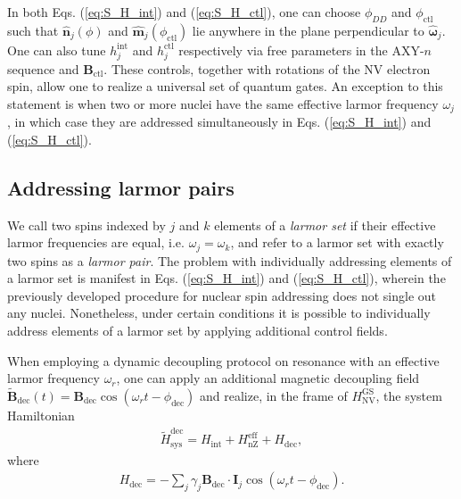\documentclass[twocolumn]{revtex4-1}
\renewcommand{\t}{\text} %
\newcommand{\p}[1]{\left(#1\right)} %
\renewcommand{\v}{\bm} %
\newcommand{\uv}[1]{\hat{\v{#1}}} %
\renewcommand{\c}{\cdot} %
\newcommand{\NV}{\t{NV}}
\begin{document}
In both Eqs. (\ref{eq:S_H_int}) and (\ref{eq:S_H_ctl}), one can choose
$\phi_{DD}$ and $\phi_{\t{ctl}}$ such that $\uv n_j\p\phi$ and
$\uv m_j\p{\phi_{\t{ctl}}}$ lie anywhere in the plane perpendicular to
$\uv\omega_j$. One can also tune $h_j^{\t{int}}$ and $h_j^{\t{ctl}}$
respectively via free parameters in the AXY-$n$ sequence and
$\v B_{\t{ctl}}$. These controls, together with rotations of the NV
electron spin, allow one to realize a universal set of quantum
gates. An exception to this statement is when two or more nuclei have
the same effective larmor frequency $\omega_j$, in which case they are
addressed simultaneously in Eqs. (\ref{eq:S_H_int}) and
(\ref{eq:S_H_ctl}).

\subsection{Addressing larmor pairs}
\label{sec:addressing_pairs}

We call two spins indexed by $j$ and $k$ elements of a \emph{larmor
  set} if their effective larmor frequencies are equal,
i.e. $\omega_j=\omega_k$, and refer to a larmor set with exactly two
spins as a \emph{larmor pair}. The problem with individually
addressing elements of a larmor set is manifest in
Eqs. (\ref{eq:S_H_int}) and (\ref{eq:S_H_ctl}), wherein the previously
developed procedure for nuclear spin addressing does not single out
any nuclei. Nonetheless, under certain conditions it is possible to
individually address elements of a larmor set by applying additional
control fields.

When employing a dynamic decoupling protocol on resonance with an
effective larmor frequency $\omega_r$, one can apply an additional
magnetic decoupling field
$\tilde{\v B}_{\t{dec}}\p{t}=\v B_{\t{dec}}\cos\p{\omega_r
  t-\phi_{\t{dec}}}$ and realize, in the frame of $H_\NV^{\t{GS}}$,
the system Hamiltonian
\begin{align}
  \tilde H_{\t{sys}}^{\t{dec}}
  = H_{\t{int}} + H_{\t{nZ}}^{\t{eff}} + H_{\t{dec}},
\end{align}
where
\begin{align}
  H_{\t{dec}} = -\sum_j\gamma_j\v B_{\t{dec}}\c\v I_j
  \cos\p{\omega_rt-\phi_{\t{dec}}}.
\end{align}
\end{document}
